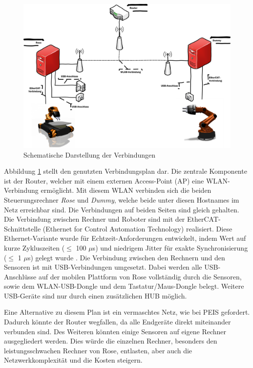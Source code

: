 \begin{figure}[H]
	\centering
	\includegraphics[scale=0.5]{fig/netw}   
	\caption[Schematische Darstellung der Verbindungen]{Schematische Darstellung der Verbindungen}
	\label{fig:aufbau-netw}
\end{figure}

Abbildung \ref{fig:aufbau-netw} stellt den genutzten Verbindungsplan dar. Die zentrale Komponente ist der Router, welcher mit einem externen Access-Point (AP) eine WLAN-Verbindung ermöglicht. Mit diesem WLAN verbinden sich die beiden Steuerungsrechner \textit{Rose} und \textit{Dummy}, welche beide unter diesen Hostnames im Netz erreichbar sind. Die Verbindungen auf beiden Seiten sind gleich gehalten. Die Verbindung zwischen Rechner und Roboter sind mit der EtherCAT-Schnittstelle (Ethernet for Control Automation Technology) realisiert. Diese Ethernet-Variante wurde für Echtzeit-Anforderungen entwickelt, indem Wert auf kurze Zykluszeiten ($\leq$ 100 $\mu$s) und  niedrigem Jitter für exakte Synchronisierung ($\leq$ 1 $\mu$s) gelegt wurde \citep{ethercat}.  Die Verbindung zwischen den Rechnern und den Sensoren ist mit USB-Verbindungen umgesetzt. Dabei werden alle USB-Anschlüsse auf der mobilen Plattform von Rose vollständig durch die Sensoren, sowie dem WLAN-USB-Dongle und dem Tastatur/Maus-Dongle belegt. Weitere USB-Geräte sind nur durch einen zusätzlichen HUB möglich. 

Eine Alternative zu diesem Plan ist ein vermaschtes Netz, wie bei PEIS gefordert. Dadurch könnte der Router wegfallen, da alle Endgeräte direkt miteinander verbunden sind. Des Weiteren könnten einige Sensoren auf eigene Rechner ausgegliedert werden. Dies würde die einzelnen Rechner, besonders den leistungsschwachen Rechner von Rose, entlasten, aber auch die Netzwerkkomplexität und die Kosten steigern.

